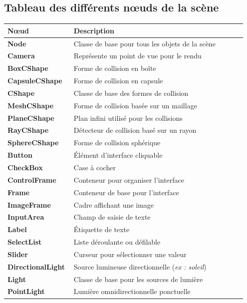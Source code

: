 \newpage
\subsection{Tableau des différents n\oe{}uds de la scène}
    \renewcommand{\arraystretch}{1.2}
    \setlength{\tabcolsep}{10pt}

    \begin{longtable}{>{\bfseries}p{0.25\linewidth} p{0.7\linewidth}}
        \toprule
        \textbf{Nœud} & \textbf{Description} \\
        \midrule
        Node & Classe de base pour tous les objets de la scène \\
        Camera & Représente un point de vue pour le rendu \\
        BoxCShape & Forme de collision en boîte \\
        CapsuleCShape & Forme de collision en capsule \\
        CShape & Classe de base des formes de collision \\
        MeshCShape & Forme de collision basée sur un maillage \\
        PlaneCShape & Plan infini utilisé pour les collisions \\
        RayCShape & Détecteur de collision basé sur un rayon \\
        SphereCShape & Forme de collision sphérique \\
        Button & Élément d'interface cliquable \\
        CheckBox & Case à cocher \\
        ControlFrame & Conteneur pour organiser l'interface \\
        Frame & Conteneur de base pour l'interface \\
        ImageFrame & Cadre affichant une image \\
        InputArea & Champ de saisie de texte \\
        Label & Étiquette de texte \\
        SelectList & Liste déroulante ou défilable \\
        Slider & Curseur pour sélectionner une valeur \\
        DirectionalLight & Source lumineuse directionnelle (\textit{ex : soleil}) \\
        Light & Classe de base pour les sources de lumière \\
        PointLight & Lumière omnidirectionnelle ponctuelle \\

\end{longtable}
